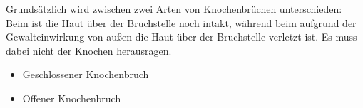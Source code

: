 


\subsubsection{}
\label{topic:knochenbruch-eh}

{%
Grundsätzlich wird zwischen zwei Arten von Knochenbrüchen
unterschieden: Beim  ist die
Haut über der Bruchstelle noch intakt, während beim
 aufgrund der Gewalteinwirkung von
außen die Haut über der Bruchstelle verletzt ist. Es muss
dabei nicht der Knochen herausragen.
}{
\begin{itemize}
    \item Geschlossener Knochenbruch
    \item Offener Knochenbruch
\end{itemize}
}{}{}{}

